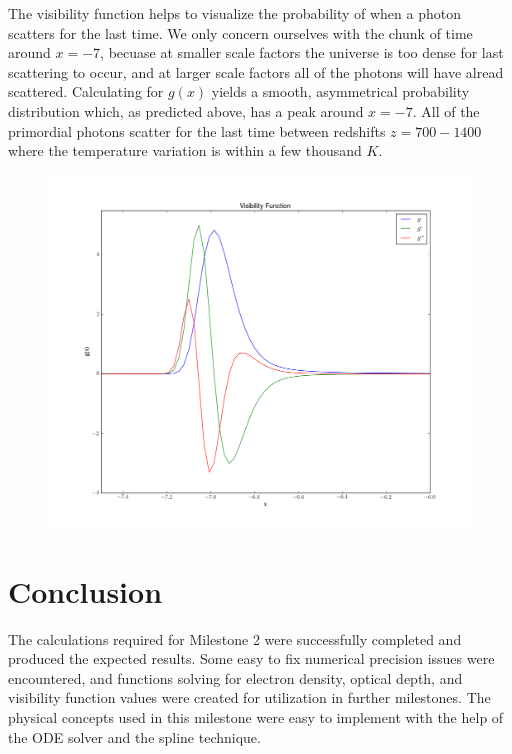 \documentclass[twoside]{article}
\begin{document}
\clearpage

The visibility function helps to visualize the probability of when a photon scatters for the last time. We only concern ourselves with the chunk of time around $x=-7$, becuase at smaller scale factors the universe is too dense for last scattering to occur, and at larger scale factors all of the photons will have alread scattered. Calculating for $g(x)$ yields a smooth, asymmetrical probability distribution which, as predicted above, has a peak around $x=-7$. All of the primordial photons scatter for the last time between redshifts $z=700-1400$ where the temperature variation is within a few thousand $K$.

\begin{figure}[ht!]\label{fig:vis}
\includegraphics[scale=0.45]{visibilityfunctions}
\end{figure}

\clearpage

\section{Conclusion}\label{sec:conc}

The calculations required for Milestone 2 were successfully completed and produced the expected results. Some easy to fix numerical precision issues were encountered, and functions solving for electron density, optical depth, and visibility function values were created for utilization in further milestones. The physical concepts used in this milestone were easy to implement with the help of the ODE solver and the spline technique.
\end{document}
